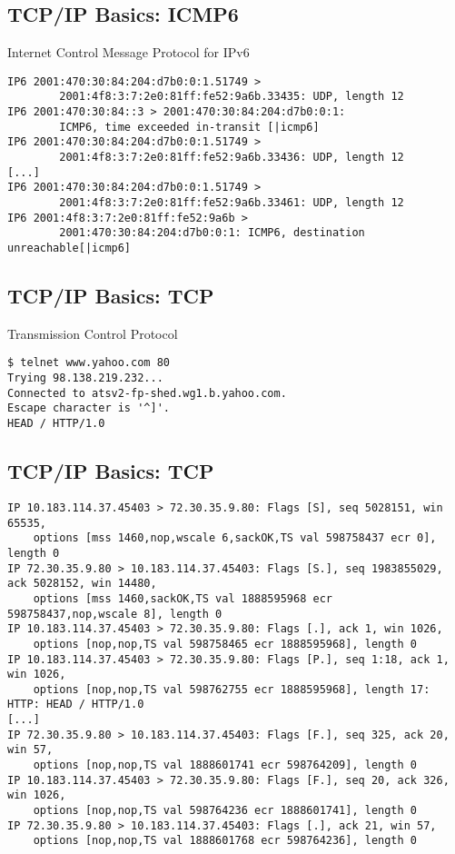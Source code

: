 \documentclass[xga]{xdvislides}
\begin{document}
\subsection{TCP/IP Basics: ICMP6}
\begin{center}
Internet Control Message Protocol for IPv6
\end{center}

\begin{verbatim}
IP6 2001:470:30:84:204:d7b0:0:1.51749 >
        2001:4f8:3:7:2e0:81ff:fe52:9a6b.33435: UDP, length 12
IP6 2001:470:30:84::3 > 2001:470:30:84:204:d7b0:0:1:
        ICMP6, time exceeded in-transit [|icmp6]
IP6 2001:470:30:84:204:d7b0:0:1.51749 >
        2001:4f8:3:7:2e0:81ff:fe52:9a6b.33436: UDP, length 12
[...]
IP6 2001:470:30:84:204:d7b0:0:1.51749 >
        2001:4f8:3:7:2e0:81ff:fe52:9a6b.33461: UDP, length 12
IP6 2001:4f8:3:7:2e0:81ff:fe52:9a6b >
        2001:470:30:84:204:d7b0:0:1: ICMP6, destination unreachable[|icmp6]
\end{verbatim}

\subsection{TCP/IP Basics: TCP}
\begin{center}
Transmission Control Protocol
\end{center}
\vspace{.2in}
\begin{verbatim}
$ telnet www.yahoo.com 80
Trying 98.138.219.232...
Connected to atsv2-fp-shed.wg1.b.yahoo.com.
Escape character is '^]'.
HEAD / HTTP/1.0
\end{verbatim}

\subsection{TCP/IP Basics: TCP}
\begin{verbatim}
IP 10.183.114.37.45403 > 72.30.35.9.80: Flags [S], seq 5028151, win 65535,
	options [mss 1460,nop,wscale 6,sackOK,TS val 598758437 ecr 0], length 0
IP 72.30.35.9.80 > 10.183.114.37.45403: Flags [S.], seq 1983855029, ack 5028152, win 14480,
	options [mss 1460,sackOK,TS val 1888595968 ecr 598758437,nop,wscale 8], length 0
IP 10.183.114.37.45403 > 72.30.35.9.80: Flags [.], ack 1, win 1026,
	options [nop,nop,TS val 598758465 ecr 1888595968], length 0
IP 10.183.114.37.45403 > 72.30.35.9.80: Flags [P.], seq 1:18, ack 1, win 1026,
	options [nop,nop,TS val 598762755 ecr 1888595968], length 17: HTTP: HEAD / HTTP/1.0
[...]
IP 72.30.35.9.80 > 10.183.114.37.45403: Flags [F.], seq 325, ack 20, win 57,
	options [nop,nop,TS val 1888601741 ecr 598764209], length 0
IP 10.183.114.37.45403 > 72.30.35.9.80: Flags [F.], seq 20, ack 326, win 1026,
	options [nop,nop,TS val 598764236 ecr 1888601741], length 0
IP 72.30.35.9.80 > 10.183.114.37.45403: Flags [.], ack 21, win 57,
	options [nop,nop,TS val 1888601768 ecr 598764236], length 0
\end{verbatim}
\end{document}
